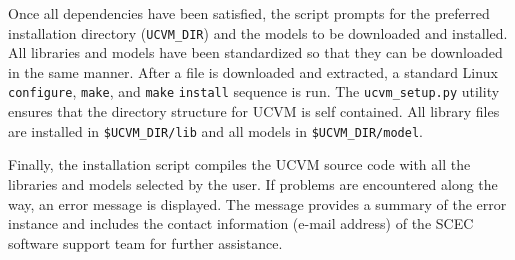 Once all dependencies have been satisfied, the script prompts for the preferred installation directory (\texttt{UCVM\_DIR}) and the models to be downloaded and installed. All libraries and models have been standardized so that they can be downloaded in the same manner. After a file is downloaded and extracted, a standard Linux \texttt{configure}, \texttt{make}, and \texttt{make} \texttt{install} sequence is run. The \texttt{ucvm\_setup.py} utility ensures that the directory structure for UCVM is self contained. All library files are installed in \texttt{\$UCVM\_DIR/lib} and all models in \texttt{\$UCVM\_DIR/model}.

Finally, the installation script compiles the UCVM source code with all the libraries and models selected by the user. If problems are encountered along the way, an error message is displayed. The message provides a summary of the error instance and includes the contact information (e-mail address) of the SCEC software support team for further assistance.

